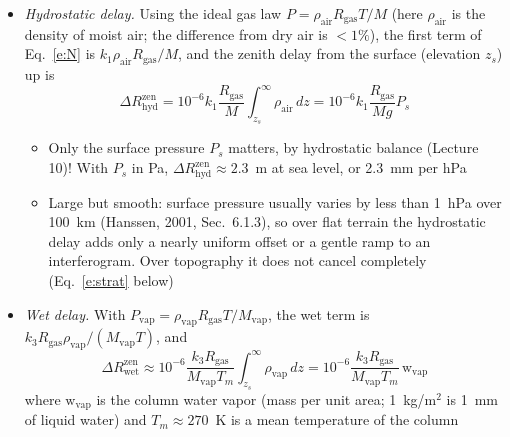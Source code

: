 \documentclass[11pt, oneside]{article}
\newcommand{\wv}{\mathrm{w_{vap}}}
\newcommand{\Pvap}{P_\mathrm{vap}}
\newcommand{\Mvap}{M_\mathrm{vap}}
\begin{document}
\begin{itemize}
	\item \emph{Hydrostatic delay.} Using the ideal gas law $P = \rho_\mathrm{air}R_\mathrm{gas}T/M$ (here $\rho_\mathrm{air}$ is the density of moist air; the difference from dry air is $<1\%$), the first term of Eq.~\eqref{e:N} is $k_1\rho_\mathrm{air}R_\mathrm{gas}/M$, and the zenith delay from the surface (elevation $z_s$) up is
	\begin{equation}
		\label{e:zhd}
		\Delta R^\mathrm{zen}_\mathrm{hyd} = 10^{-6}k_1\frac{R_\mathrm{gas}}{M}\int_{z_s}^\infty\rho_\mathrm{air}\,dz = 10^{-6}k_1\frac{R_\mathrm{gas}}{Mg}P_s
	\end{equation}
	\begin{itemize}
		\item Only the surface pressure $P_s$ matters, by hydrostatic balance (Lecture 10)! With $P_s$ in Pa, $\Delta R^\mathrm{zen}_\mathrm{hyd} \approx 2.3$~m at sea level, or 2.3~mm per hPa
		\item Large but smooth: surface pressure usually varies by less than 1~hPa over 100~km (Hanssen, 2001, Sec.~6.1.3), so over flat terrain the hydrostatic delay adds only a nearly uniform offset or a gentle ramp to an interferogram. Over topography it does not cancel completely (Eq.~\eqref{e:strat} below)
	\end{itemize}
	\item \emph{Wet delay.} With $\Pvap = \rho_\mathrm{vap}R_\mathrm{gas}T/\Mvap$, the wet term is $k_3R_\mathrm{gas}\rho_\mathrm{vap}/(\Mvap T)$, and
	\begin{equation}
		\label{e:zwd}
		\Delta R^\mathrm{zen}_\mathrm{wet} \approx 10^{-6}\frac{k_3R_\mathrm{gas}}{\Mvap T_m}\int_{z_s}^\infty\rho_\mathrm{vap}\,dz = 10^{-6}\frac{k_3R_\mathrm{gas}}{\Mvap T_m}\,\wv
	\end{equation}
	where $\wv$ is the column water vapor (mass per unit area; 1~kg/m$^2$ is 1~mm of liquid water) and $T_m \approx 270$~K is a mean temperature of the column

\end{itemize}
\end{document}
